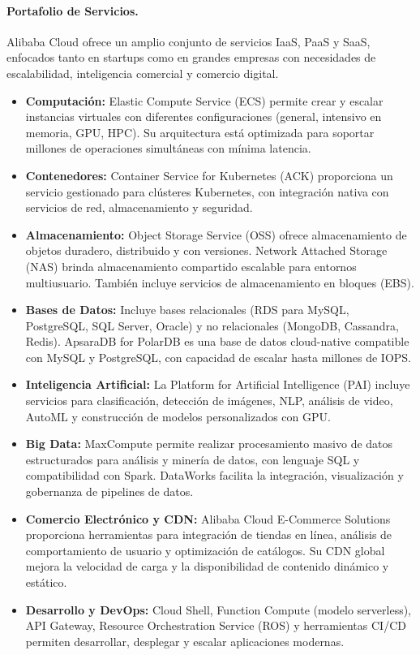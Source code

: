 {                \paragraph{Portafolio de Servicios.}
                Alibaba Cloud ofrece un amplio conjunto de servicios IaaS, PaaS y SaaS, enfocados tanto en startups como en grandes empresas con necesidades de escalabilidad, inteligencia comercial y comercio digital.
                
                \begin{itemize}
                    \item \textbf{Computación:} Elastic Compute Service (ECS) permite crear y escalar instancias virtuales con diferentes configuraciones (general, intensivo en memoria, GPU, HPC). Su arquitectura está optimizada para soportar millones de operaciones simultáneas con mínima latencia.
                    \item \textbf{Contenedores:} Container Service for Kubernetes (ACK) proporciona un servicio gestionado para clústeres Kubernetes, con integración nativa con servicios de red, almacenamiento y seguridad.
                    \item \textbf{Almacenamiento:} Object Storage Service (OSS) ofrece almacenamiento de objetos duradero, distribuido y con versiones. Network Attached Storage (NAS) brinda almacenamiento compartido escalable para entornos multiusuario. También incluye servicios de almacenamiento en bloques (EBS).
                    \item \textbf{Bases de Datos:} Incluye bases relacionales (RDS para MySQL, PostgreSQL, SQL Server, Oracle) y no relacionales (MongoDB, Cassandra, Redis). ApsaraDB for PolarDB es una base de datos cloud-native compatible con MySQL y PostgreSQL, con capacidad de escalar hasta millones de IOPS.
                    \item \textbf{Inteligencia Artificial:} La Platform for Artificial Intelligence (PAI) incluye servicios para clasificación, detección de imágenes, NLP, análisis de video, AutoML y construcción de modelos personalizados con GPU.
                    \item \textbf{Big Data:} MaxCompute permite realizar procesamiento masivo de datos estructurados para análisis y minería de datos, con lenguaje SQL y compatibilidad con Spark. DataWorks facilita la integración, visualización y gobernanza de pipelines de datos.
                    \item \textbf{Comercio Electrónico y CDN:} Alibaba Cloud E-Commerce Solutions proporciona herramientas para integración de tiendas en línea, análisis de comportamiento de usuario y optimización de catálogos. Su CDN global mejora la velocidad de carga y la disponibilidad de contenido dinámico y estático.
                    \item \textbf{Desarrollo y DevOps:} Cloud Shell, Function Compute (modelo serverless), API Gateway, Resource Orchestration Service (ROS) y herramientas CI/CD permiten desarrollar, desplegar y escalar aplicaciones modernas.
                \end{itemize}
                
}
